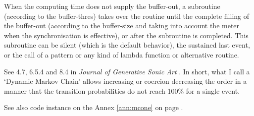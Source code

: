 %   
%
%

\bigskip
\bigskip

{}

\bigskip

When the computing time does not supply the buffer-out, a subroutine (according to the buffer-thres) takes over the routine until the complete filling of the buffer-out (according to the buffer-size and  taking into account the meter when the synchronisation is effective), or after the subroutine is completed. This subroutine can be silent (which is the default behavior), the sustained last event, or the call of a pattern or any kind of lambda function or alternative routine.

\bigskip
\bigskip


\bigskip

See  4.7, 6.5.4 and 8.4 in \textsl{Journal of Generative Sonic Art} \citep{yi}. In short, what I call a `Dynamic Markov Chain' allows increasing or coercion decreasing the order in a manner that the transition probabilities do not reach 100\% for a single event.
 
See also code instance on the Annex \ref{ann:mcone} on page \pageref{ann:mcone}.

%
%

